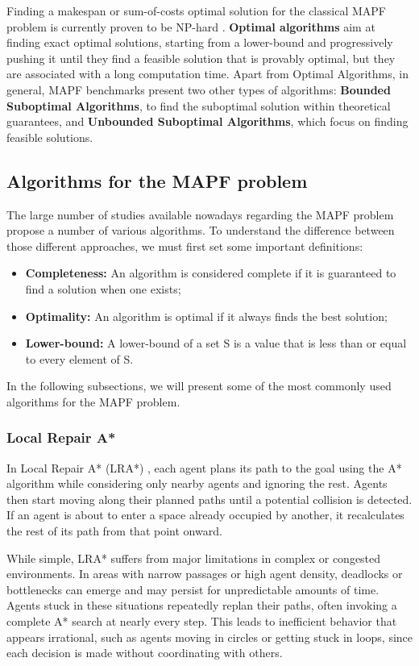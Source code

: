 Finding a makespan or sum-of-costs optimal solution for the classical MAPF problem is currently proven to be NP-hard \cite{yuStructureIntractabilityOptimal2013}. \textbf{Optimal algorithms} aim at finding exact optimal solutions, starting from a lower-bound and progressively pushing it until they find a feasible solution that is provably optimal, but they are associated with a long computation time. Apart from Optimal Algorithms, in general, MAPF benchmarks present two other types of algorithms: \textbf{Bounded Suboptimal Algorithms}, to find the suboptimal solution within theoretical guarantees, and \textbf{Unbounded Suboptimal Algorithms}, which focus on finding feasible solutions. 


\subsection{Algorithms for the MAPF problem}
The large number of studies available nowadays regarding the MAPF problem propose a number of various algorithms. To understand the difference between those different approaches, we must first set some important definitions:
\begin{itemize}
    \item \textbf{Completeness: } An algorithm is considered complete if it is guaranteed to find a solution when one exists;
    \item \textbf{Optimality: }  An algorithm is optimal if it always finds the best solution;
    \item \textbf{Lower-bound: } A lower-bound of a set S is a value that is less than or equal to every element of S.
\end{itemize}

In the following subsections, we will present some of the most commonly used algorithms for the MAPF problem.

\subsubsection{Local Repair A*}
In Local Repair A* (LRA*) \cite{silverCooperativePathfinding2005}, each agent plans its path to the goal using the A* algorithm while considering only nearby agents and ignoring the rest. Agents then start moving along their planned paths until a potential collision is detected. If an agent is about to enter a space already occupied by another, it recalculates the rest of its path from that point onward. 

While simple, LRA* suffers from major limitations in complex or congested environments. In areas with narrow passages or high agent density, deadlocks or bottlenecks can emerge and may persist for unpredictable amounts of time. Agents stuck in these situations repeatedly replan their paths, often invoking a complete A* search at nearly every step. This leads to  inefficient behavior that appears irrational, such as agents moving in circles or getting stuck in loops, since each decision is made without coordinating with others.


